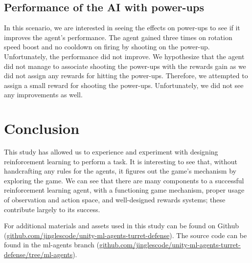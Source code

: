 \documentclass[conference]{IEEEtran}
\begin{document}
\subsection{Performance of the AI with power-ups}

In this scenario, we are interested in seeing the effects on power-ups to see if it improves the agent's performance. The agent gained three times on rotation speed boost and no cooldown on firing by shooting on the power-up. Unfortunately, the performance did not improve. We hypothesize that the agent did not manage to associate shooting the power-ups with the rewards gain as we did not assign any rewards for hitting the power-ups. Therefore, we attempted to assign a small reward for shooting the power-ups. Unfortunately, we did not see any improvements as well.

\section{Conclusion}

This study has allowed us to experience and experiment with designing reinforcement learning to perform a task. It is interesting to see that, without handcrafting any rules for the agents, it figures out the game's mechanism by exploring the game. We can see that there are many components to a successful reinforcement learning agent, with a functioning game mechanism, proper usage of observation and action space, and well-designed rewards systems; these contribute largely to its success.

For additional materials and assets used in this study can be found on Github (\href{https://github.com/jinglescode/unity-ml-agents-turret-defense}{github.com/jinglescode/unity-ml-agents-turret-defense}). The source code can be found in the ml-agents branch (\href{https://github.com/jinglescode/unity-ml-agents-turret-defense/tree/ml-agents}{github.com/jinglescode/unity-ml-agents-turret-defense/tree/ml-agents}).
\end{document}

